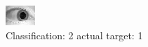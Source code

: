 \begin{figure}[h!]
\begin{center}
\includegraphics[width=0.60\columnwidth]{figures/ID1582_class_2_target_1.png}
\end{center}
\caption{ Classification: 2 actual target: 1}
\label{fig:ID1582_class_2_target_1}
\end{figure}
